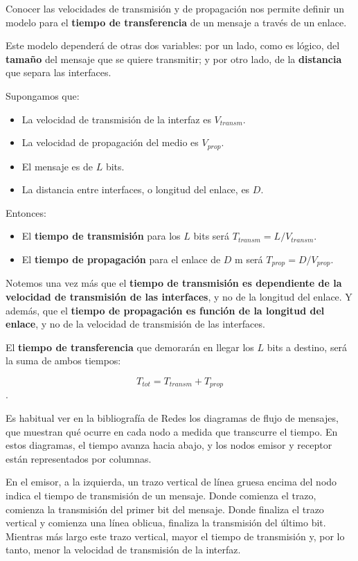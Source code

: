 \documentclass[spanish,a4paper,]{article}
\providecommand{\tightlist}{%
  \setlength{\itemsep}{0pt}\setlength{\parskip}{0pt}}
\begin{document}
Conocer las velocidades de transmisión y de propagación nos permite
definir un modelo para el \textbf{tiempo de transferencia} de un mensaje
a través de un enlace.

Este modelo dependerá de otras dos variables: por un lado, como es
lógico, del \textbf{tamaño} del mensaje que se quiere transmitir; y por
otro lado, de la \textbf{distancia} que separa las interfaces.

Supongamos que:

\begin{itemize}
\tightlist
\item
  La velocidad de transmisión de la interfaz es \(V_{transm}\).
\item
  La velocidad de propagación del medio es \(V_{prop}\).
\item
  El mensaje es de \(L\) bits.
\item
  La distancia entre interfaces, o longitud del enlace, es \(D\).
\end{itemize}

Entonces:

\begin{itemize}
\tightlist
\item
  El \textbf{tiempo de transmisión} para los \(L\) bits será
  \(T_{transm} = L / V_{transm}\).
\item
  El \textbf{tiempo de propagación} para el enlace de \(D\) m será
  \(T_{prop} = D / V_{prop}\).
\end{itemize}

Notemos una vez más que el \textbf{tiempo de transmisión es dependiente
de la velocidad de transmisión de las interfaces}, y no de la longitud
del enlace. Y además, que el \textbf{tiempo de propagación es función de
la longitud del enlace}, y no de la velocidad de transmisión de las
interfaces.

El \textbf{tiempo de transferencia} que demorarán en llegar los \(L\)
bits a destino, será la suma de ambos tiempos:

\[T_{tot} = T_{transm} + T_{prop}\].

Es habitual ver en la bibliografía de Redes los diagramas de flujo de
mensajes, que muestran qué ocurre en cada nodo a medida que transcurre
el tiempo. En estos diagramas, el tiempo avanza hacia abajo, y los nodos
emisor y receptor están representados por columnas.

En el emisor, a la izquierda, un trazo vertical de línea gruesa encima
del nodo indica el tiempo de transmisión de un mensaje. Donde comienza
el trazo, comienza la transmisión del primer bit del mensaje. Donde
finaliza el trazo vertical y comienza una línea oblicua, finaliza la
transmisión del último bit. Mientras más largo este trazo vertical,
mayor el tiempo de transmisión y, por lo tanto, menor la velocidad de
transmisión de la interfaz.
\end{document}

